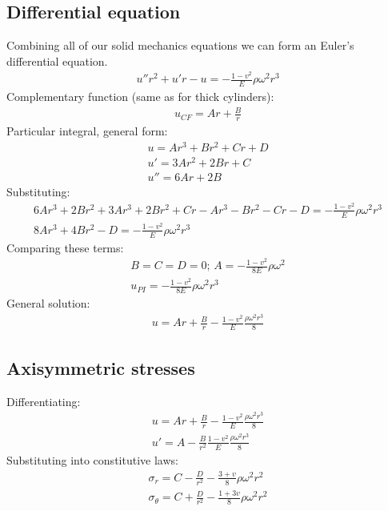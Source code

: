 \documentclass[class=report, crop=false, 12pt,a4paper]{standalone}
\begin{document}
\subsection{Differential equation}
Combining all of our solid mechanics equations we can form an Euler's differential equation.
\begin{gather}
    u''r^2 + u'r -u=-\frac{1-v^2}{E}\rho\omega^2 r^3
\end{gather}
Complementary function (same as for thick cylinders):
\begin{gather}
    u_{CF} = Ar + \frac{B}{r}
\end{gather}
Particular integral, general form:
\begin{gather}
    u = Ar^3 + Br^2 + Cr + D\\
    u' = 3Ar^2 + 2Br + C\\
    u'' = 6Ar + 2B
\end{gather}
Substituting:
\begin{gather}
    6Ar^3 + 2Br^2 + 3Ar^3 + 2Br^2 + Cr - Ar^3 - Br^2 - Cr - D = - \frac{1-v^2}{E} \rho \omega^2 r^3\\
    8 Ar^3 + 4Br^2 - D = - \frac{1-v^2}{E}\rho\omega^2 r^3
\end{gather}
Comparing these terms:
\begin{gather}
    B = C = D = 0; \, A = -\frac{1-v^2}{8E}\rho\omega^2\\
    u_{PI} = - \frac{1-v^2}{8E}\rho\omega^2 r^3
\end{gather}
General solution:
\begin{gather}
    u = Ar + \frac{B}{r} - \frac{1-v^2}{E} \frac{\rho\omega^2 r^3}{8}
\end{gather}
\subsection{Axisymmetric stresses}
Differentiating:
\begin{gather}
    u = Ar + \frac{B}{r} - \frac{1-v^2}{E} \frac{\rho\omega^2 r^3}{8}\\
    u' = A - \frac{B}{r^2} \frac{1-v^2}{E}\frac{\rho \omega^2 r^3}{8}
\end{gather}
Substituting into constitutive laws:
\begin{gather}
    \sigma_r = C - \frac{D}{r^2} - \frac{3 + v}{8}\rho \omega^2 r^2\\
    \sigma_{\theta} = C + \frac{D}{r^2} - \frac{1+ 3v}{8}\rho\omega^2 r^2 
\end{gather}
\end{document}
